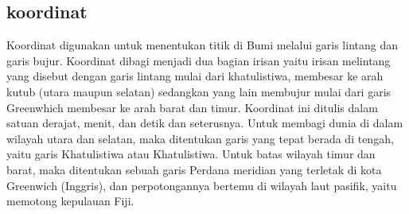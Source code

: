 \begin{enumerate}
\subsection{koordinat}
Koordinat digunakan untuk menentukan titik di Bumi melalui garis lintang dan garis bujur.  Koordinat dibagi menjadi dua bagian irisan yaitu irisan melintang yang disebut dengan garis lintang mulai dari khatulistiwa, membesar ke arah kutub (utara maupun selatan) sedangkan yang lain membujur mulai dari garis Greenwhich membesar ke arah barat dan timur.  Koordinat ini ditulis dalam satuan derajat, menit, dan detik dan seterusnya. Untuk membagi dunia di dalam wilayah utara dan selatan, maka ditentukan garis yang tepat berada di tengah, yaitu garis Khatulistiwa atau Khatulistiwa. Untuk batas wilayah timur dan  barat, maka ditentukan sebuah garis Perdana meridian yang terletak di kota Greenwich (Inggris), dan perpotongannya bertemu di wilayah laut pasifik, yaitu memotong kepulauan Fiji.
\begin{itemize}


\end{itemize}
\end{enumerate}

